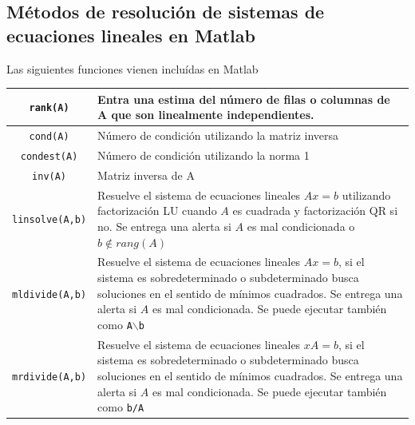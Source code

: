 \documentclass[12pt,letterpaper]{article}
\begin{document}
\subsection{M\'etodos de resoluci\'on de sistemas de ecuaciones lineales en Matlab}

Las siguientes funciones vienen inclu\'idas en Matlab

\begin{longtable}{||c|p{}||}
\hline
\texttt{rank(A)}	& 	Entra una estima del n\'umero de filas o columnas de A que son linealmente independientes.\\
\hline
\texttt{cond(A)}	&	N\'umero de condici\'on utilizando la matriz inversa \\
\hline
\texttt{condest(A)}	& 	N\'umero de condici\'on utilizando la norma 1\\
\hline
\texttt{inv(A)}		& 	Matriz inversa de A\\
\hline
\texttt{linsolve(A,b)} & Resuelve el sistema de ecuaciones lineales $Ax=b$  utilizando factorizaci\'on LU cuando $A$ es cuadrada y  factorizaci\'on QR si no. Se entrega una alerta si $A$ es mal condicionada o $b\notin rang(A)$\\
\hline
\texttt{mldivide(A,b)} & Resuelve el sistema de ecuaciones lineales $Ax=b$, si el sistema es sobredeterminado o subdeterminado busca soluciones en el sentido de m\'inimos cuadrados. Se entrega una alerta si $A$ es mal condicionada. Se puede ejecutar tambi\'en como \texttt{A$\backslash$b}\\
\hline
\texttt{mrdivide(A,b)} & Resuelve el sistema de ecuaciones lineales $xA=b$, si el sistema es sobredeterminado o subdeterminado busca soluciones en el sentido de m\'inimos cuadrados. Se entrega una alerta si $A$ es mal condicionada. Se puede ejecutar tambi\'en como \texttt{b/A}\\
\hline
\end{longtable}
\end{document}
